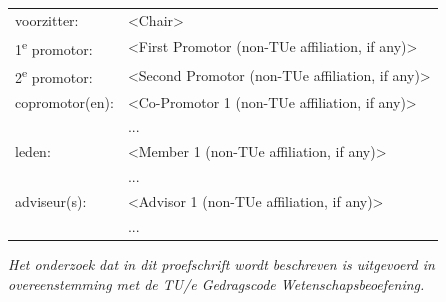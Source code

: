 \vspace*{\baselineskip}

\noindent
\begin{tabular}{@{}ll}
  voorzitter:                       & <Chair>\\
  1\textsuperscript{e} promotor:    & <First Promotor (non-TUe affiliation, if any)>\\
  2\textsuperscript{e} promotor:    & <Second Promotor (non-TUe affiliation, if any)>\\
  copromotor(en):                   & <Co-Promotor 1 (non-TUe affiliation, if any)>\\
                                    & ...\\
  leden:                            & <Member 1 (non-TUe affiliation, if any)>\\
                                    & ... \\
  adviseur(s):                      & <Advisor 1 (non-TUe affiliation, if any)>\\
                                    & ...
\end{tabular}

\vfill

\noindent
{\itshape%
  Het onderzoek dat in dit proefschrift wordt
  beschreven is uitgevoerd in overeenstemming met de TU/e Gedragscode
  Wetenschapsbeoefening.}
